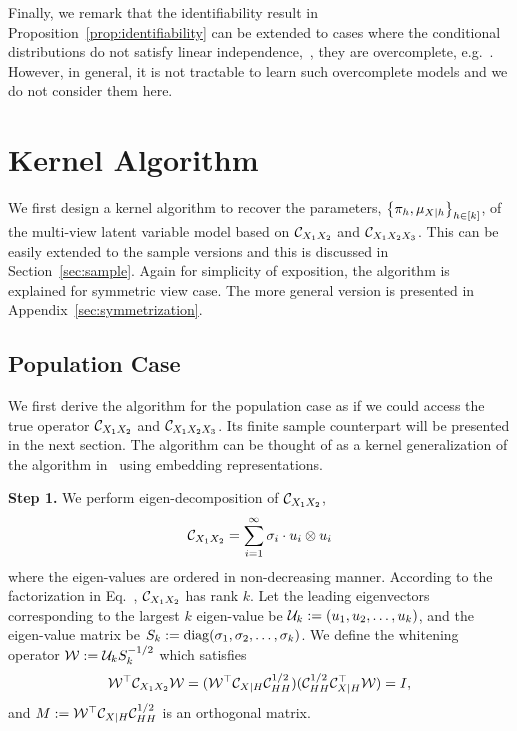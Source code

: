 \documentclass{article}
\begin{document}
Finally, we remark that the identifiability result in Proposition~\ref{prop:identifiability} can be extended to cases where the conditional distributions do not satisfy linear independence,~\ie, they are overcomplete, e.g.~\cite{Kruskal:77,DeLathauwerEtal:FOOBI,AnandkumarEtal:overcomplete13}. However, in general, it is not tractable to learn such overcomplete models and we do not consider them here.

\section{Kernel Algorithm}

We first design a kernel algorithm to recover the parameters, $\left\{\pi_h, \mu_{X|h}\right\}_{h \in [k]}$, of the multi-view latent variable model based on $\mathcal{C}_{X_1 X_2}$ and $\mathcal{C}_{X_1 X_2 X_3}$. This can be easily extended to the sample versions and this is discussed in Section~\ref{sec:sample}. Again for simplicity of exposition, the algorithm is explained for symmetric view case. The more general version is presented in Appendix~\ref{sec:symmetrization}.

\subsection{Population Case}

We  first derive the algorithm for the population case as if we could access the true operator $\mathcal{C}_{X_1 X_2}$ and $\mathcal{C}_{X_1 X_2 X_3}$. Its finite sample counterpart  will be presented in the next section. The algorithm can be thought of as a kernel generalization of the algorithm in~\cite{AnandkumarEtal:community12} using embedding representations.

{\bf Step 1.} We perform eigen-decomposition of $\mathcal{C}_{X_1 X_2}$,
$$\mathcal{C}_{X_1 X_2} = \sum_{i=1}^{\infty} \sigma_i \cdot u_i \otimes u_i$$
where the eigen-values are ordered in non-decreasing manner.
According to the factorization in Eq.~, $\mathcal{C}_{X_1 X_2}$ has rank $k$.
Let the leading eigenvectors corresponding to the largest $k$ eigen-value be  $\mathcal{U}_k:=(u_1,u_2,\ldots,u_k)$, and the eigen-value matrix be $S_k:=\mathop{\mathrm{diag}}(\sigma_1,\sigma_2,\ldots,\sigma_k)$. We define the whitening operator $\mathcal{W}:= \mathcal{U}_k S_k^{-1/2}$ which satisfies
\begin{align*}
  \mathcal{W}^\top \mathcal{C}_{X_1X_2} \mathcal{W} = (\mathcal{W}^\top \mathcal{C}_{X|H} \mathcal{C}_{HH}^{1/2}) (\mathcal{C}_{HH}^{1/2} \mathcal{C}_{X|H}^\top \mathcal{W}) = I,
\end{align*}
and $M:=\mathcal{W}^\top \mathcal{C}_{X|H} \mathcal{C}_{HH}^{1/2}$ is an orthogonal matrix.
\end{document}
